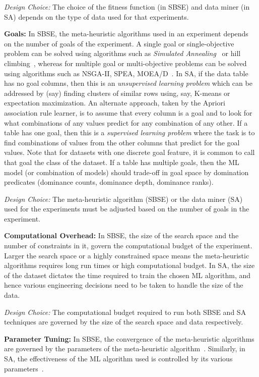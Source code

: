 \documentclass[table, xcdraw, sigconf,review, anonymous]{acmart}
\begin{document}
\noindent\textit{Design Choice:} The choice of the fitness function (in SBSE) and data miner (in SA) depends on the type of data used for that experiments. 

\noindent\textbf{Goals:} In SBSE, the meta-heuristic algorithms used in an experiment depends on the number of goals of the experiment. A single goal or single-objective problem can be solved using algorithms such as \textit{Simulated Annealing}~\cite{van1987simulated} or hill climbing~\cite{rudlof1997stochastic}, whereas for multiple goal or multi-objective problems can be solved using algorithms such as NSGA-II, SPEA, MOEA/D~\cite{zhang2007moea}. In SA, if the data table has no goal columns, then this is an \textit{unsupervised learning problem} which can be addressed by (say) finding clusters of similar rows using, say, K-means or expectation maximization. An alternate approach, taken by the Apriori association rule learner, is to assume that every column is a goal and to look for what combinations of any values predict for any combination of any other. If a table has one goal, then this is a \textit{supervised learning problem} where the task is to find combinations of values from the other columns that predict for the goal values. Note that for datasets with one discrete goal feature, it is common to call that goal the class of the dataset. If a table has multiple goals, then the ML model (or combination of models) should trade-off in goal space by domination predicates (dominance counts, dominance depth, dominance ranks).

\noindent\textit{Design Choice:} The meta-heuristic algorithm (SBSE) or the data miner (SA) used for the experiments must be adjusted based on the number of goals in the experiment.

\noindent\textbf{Computational Overhead:} In SBSE, the size of the search space and the number of constraints in it, govern the computational budget of the experiment. Larger the search space or a highly constrained space means the meta-heuristic algorithms requires long run times or high computational budget. In SA, the size of the dataset dictates the time required to train the chosen ML algorithm, and hence various engineering decisions need to be taken to handle the size of the data. 

\noindent\textit{Design Choice:} The computational budget required to run both SBSE and SA techniques are governed by the size of the search space and data respectively.

\noindent\textbf{Parameter Tuning:} In SBSE, the convergence of the meta-heuristic algorithms are governed by the parameters of the meta-heuristic algorithm~\cite{eiben2011parameter}. Similarly, in SA, the effectiveness of the ML algorithm used is controlled by its various parameters~\cite{fu2016tuning, fu2016differential, tantithamthavorn2016automated}. 
\end{document}
